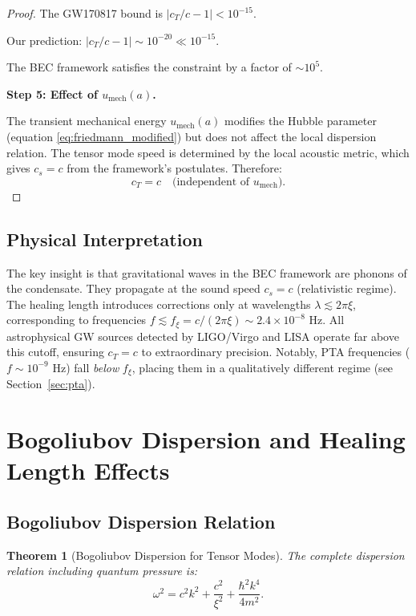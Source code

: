 \documentclass[11pt,a4paper]{article}
\newcommand{\cs}{\ensuremath{c_s}}
\newcommand{\cT}{\ensuremath{c_T}}
\newcommand{\umech}{\ensuremath{u_{\mathrm{mech}}}}
\newtheorem{theorem}{Theorem}[section]
\theoremstyle{definition}
\theoremstyle{remark}
\begin{document}
\begin{proof}
The GW170817 bound is $|\cT/c - 1| < 10^{-15}$.

Our prediction: $|\cT/c - 1| \sim 10^{-20} \ll 10^{-15}$.

The BEC framework satisfies the constraint by a factor of $\sim 10^{5}$.

\textbf{Step 5: Effect of $\umech(a)$.}

The transient mechanical energy $\umech(a)$ modifies the Hubble parameter (equation \ref{eq:friedmann_modified}) but does not affect the local dispersion relation. The tensor mode speed is determined by the local acoustic metric, which gives $\cs = c$ from the framework's postulates. Therefore:
\begin{equation}
\cT = c \quad \text{(independent of } \umech).
\end{equation}
\end{proof}

\subsection{Physical Interpretation}
\label{sec:interpretation}

The key insight is that gravitational waves in the BEC framework are phonons of the condensate. They propagate at the sound speed $\cs = c$ (relativistic regime). The healing length introduces corrections only at wavelengths $\lambda \lesssim 2\pi\xi$, corresponding to frequencies $f \lesssim f_\xi = c/(2\pi\xi) \sim 2.4 \times 10^{-8}$ Hz. All astrophysical GW sources detected by LIGO/Virgo and LISA operate far above this cutoff, ensuring $\cT = c$ to extraordinary precision. Notably, PTA frequencies ($f \sim 10^{-9}$ Hz) fall \emph{below} $f_\xi$, placing them in a qualitatively different regime (see Section~\ref{sec:pta}).

\section{Bogoliubov Dispersion and Healing Length Effects}
\label{sec:dispersion}

\subsection{Bogoliubov Dispersion Relation}
\label{sec:bogoliubov}

\begin{theorem}[Bogoliubov Dispersion for Tensor Modes]
\label{thm:bogoliubov}
The complete dispersion relation including quantum pressure is:
\begin{equation}
\label{eq:bogoliubov}
\boxed{\omega^2 = c^2 k^2 + \frac{c^2}{\xi^2} + \frac{\hbar^2 k^4}{4m^2}.}
\end{equation}
\end{theorem}
\end{document}
